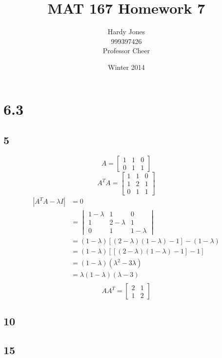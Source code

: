 \documentclass[12pt,letterpaper]{article}
\title{MAT 167 Homework 7\vspace{-2ex}}
\author{Hardy Jones\\
        999397426\\
        Professor Cheer\vspace{-2ex}}
\date{Winter 2014}
\begin{document}
  \maketitle

  \section*{6.3}
    \subsection*{5}
      \[
        A =
        \begin{bmatrix}
          1 & 1 & 0 \\
          0 & 1 & 1
        \end{bmatrix}
      \]
      \[
        A^TA =
        \begin{bmatrix}
          1 & 1 & 0 \\
          1 & 2 & 1 \\
          0 & 1 & 1
        \end{bmatrix}
      \]
      \begin{align*}
        |A^TA - \lambda I| &= 0 \\
        &=  \begin{vmatrix}
              1 - \lambda & 1 & 0 \\
              1 & 2 - \lambda & 1 \\
              0 & 1 & 1 - \lambda
            \end{vmatrix} \\
        &= (1 - \lambda) [(2 - \lambda)(1 - \lambda) - 1] - (1 - \lambda) \\
        &= (1 - \lambda) [[(2 - \lambda)(1 - \lambda) - 1] - 1] \\
        &= (1 - \lambda) (\lambda^2 - 3\lambda) \\
        &= \lambda (1 - \lambda) (\lambda - 3) \\
      \end{align*}
      \[
        AA^T =
        \begin{bmatrix}
          2 & 1 \\
          1 & 2
        \end{bmatrix}
      \]
    \subsection*{10}
    \subsection*{15}
\end{document}
